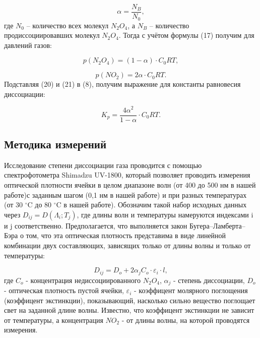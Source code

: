 \documentclass[a4paper,12pt]{article} %
\begin{document}
\begin{equation}
 \alpha = \frac{N_B}{N_0},	
\end{equation}
где $N_0$ -- количество всех молекул $N_2 O_4$, а $N_B$ -- количество продиссоциировавших молекул $N_2 O_4$.
Тогда с учётом формулы (17) получим для давлений газов:

\begin{equation}
 p(N_2 O_4)  = (1 - \alpha) \cdot C_0 RT,
\end{equation}


\begin{equation}
p(N O_2)  = 2\alpha \cdot C_0 RT.
\end{equation}
Подставляя (20) и (21) в (8), получим выражение для константы равновесия диссоциации:

\begin{equation}
K_p = \frac{4 \alpha^2}{1- \alpha}\cdot C_0 RT.
\end{equation}



\subsection*{Методика измерений}

Исследование степени диссоциации газа проводится с помощью спектрофотометра Shimadzu UV-1800, который позволяет проводить измерения оптической плотности ячейки в целом диапазоне волн (от 400 до 500 нм в нашей работе)с заданным шагом (0,1 нм в нашей работе) и при разных температурах (от 30 $^\circ$C до 80 $^\circ$C в нашей работе). Обозначим такой набор исходных данных через \(D_{ij} = D(\Lambda_i;T_j)\), где длины волн и температуры намеруются индексами i и j соответственно. Предполагается, что выполняется закон Бугера--Ламберта--Бэра о том, что эта оптическая плотность представима в виде  линейной комбинации двух составляющих, зависящих только от длины волны и только от температуры:

\begin{equation}
 D_{ij} =D_o + 2\alpha_jC_o \cdot \varepsilon_i \cdot l,
\end{equation}
где $C_o$ - концентрация недиссоциированного $N_2 O_4$, $\alpha_j$ - степень диссоциации, $D_o$ - оптическая плотность пустой ячейки, $\varepsilon_i$ -  коэффицент молярного поглощения (коэффицент экстинкции), показывающий, насколько сильно вещество поглощает свет на заданной длине волны. Известно, что коэффицент экстинкции не зависит от температуры, а концентрация $NO_2$ - от длины волны, на которой проводятся измерения. 
\end{document}
